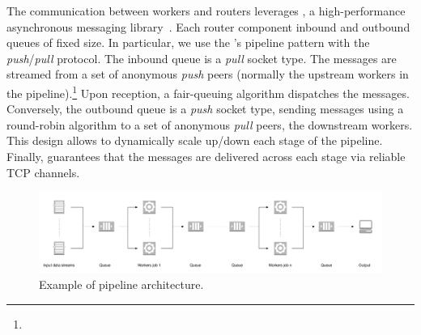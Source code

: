 The communication between workers and routers leverages \zmq, a high-performance asynchronous messaging library~\cite{zero_mq}.
Each router component inbound and outbound queues of fixed size.
In particular, we use the \zmq's pipeline pattern with the \emph{push}/\emph{pull} protocol\cite{zero_mq:pipeline}.
The inbound queue is a \emph{pull} socket type.
The messages are streamed from a set of anonymous \emph{push} peers (normally the upstream workers in the pipeline).\footnote{}
Upon reception, a fair-queuing algorithm dispatches the messages.
Conversely, the outbound queue is a \emph{push} socket type, sending messages using a round-robin algorithm to a set of anonymous \emph{pull} peers, the downstream workers.
This design allows to dynamically scale up/down each stage of the pipeline. %
Finally, \zmq guarantees that the messages are delivered across each stage via reliable TCP channels.

\begin{figure}
  \centering
  \includegraphics[scale=0.7]{images/architecture_pipeline}
  \caption{Example of \SYS pipeline architecture.}
  \label{fig:architecture_pipeline}
\end{figure}
